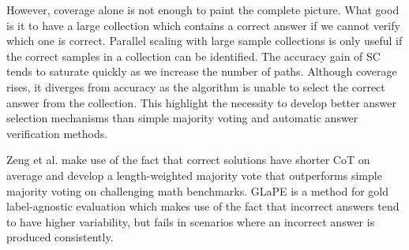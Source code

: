 However, coverage alone is not enough to paint the complete picture. What good is it to have a large collection which contains a correct answer
if we cannot verify which one is correct. Parallel scaling with large sample collections is only useful 
if the correct samples in a collection can be identified\cite{brown2024largelanguagemonkeysscaling}\cite{zeng2025revisitingtesttimescalingo1like}.
The accuracy gain of SC tends to saturate quickly as we increase the number of paths\cite{wang2023selfconsistencyimproveschainthought}.
Although coverage rises, it diverges\cite{brown2024largelanguagemonkeysscaling} from accuracy as the algorithm is unable to select the correct answer from the collection.
This highlight the necessity to develop better answer selection mechanisms than simple majority voting and automatic answer verification methods.

Zeng et al.\cite{zeng2025revisitingtesttimescalingo1like} make use of the fact that
correct solutions have shorter CoT on average and develop a length-weighted majority vote that outperforms simple majority voting on challenging math benchmarks. 
GLaPE\cite{zhang2024glapegoldlabelagnosticprompt} is a method for gold label-agnostic evaluation which makes use
of the fact that incorrect answers tend to have higher variability, but fails in scenarios where an incorrect answer is produced consistently. 

